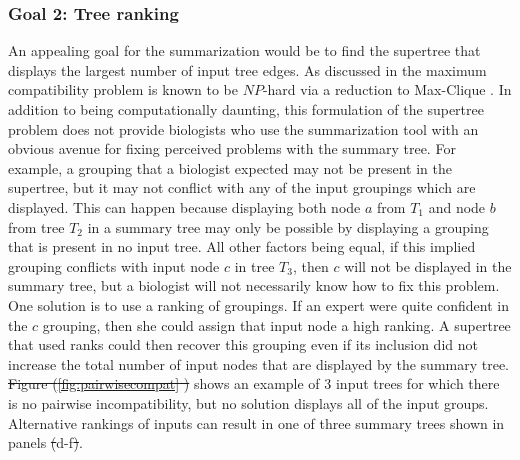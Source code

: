 \documentclass[fleqn,12pt,lineno,english]{wlpeerj}
\providecommand{\DIFaddtex}[1]{{\protect\color{blue}\uwave{#1}}} %
\providecommand{\DIFdeltex}[1]{{\protect\color{red}\sout{#1}}}                      %
\providecommand{\DIFaddbegin}{} %
\providecommand{\DIFaddend}{} %
\providecommand{\DIFdelbegin}{} %
\providecommand{\DIFdelend}{} %
\providecommand{\DIFadd}[1]{\texorpdfstring{\DIFaddtex{#1}}{#1}} %
\providecommand{\DIFdel}[1]{\texorpdfstring{\DIFdeltex{#1}}{}} %
\begin{document}
\subsubsection{Goal 2: Tree ranking}

An appealing goal for the summarization would be to find the supertree
that displays the largest number of input tree edges. As discussed
in \citet[pages 92 and 131;][]{HusonRS2010} the maximum compatibility
problem is known to be $NP$-hard via a reduction to Max-Clique \citep{Karp1972}.
In addition to being computationally daunting, this formulation of
the supertree problem does not provide biologists who use the summarization
tool with an obvious avenue for fixing perceived problems with the
summary tree. For example, a grouping that a biologist expected may
not be present in the supertree, but it may not conflict with any
of the input groupings which are displayed. This can happen because
displaying both node $a$ from $T_{1}$ and node $b$ from tree $T_{2}$
in a summary tree may only be possible by displaying a grouping that
is present in no input tree. All other factors being equal, if this
implied grouping conflicts with input node $c$ in tree $T_{3}$,
then $c$ will not be displayed in the summary tree, but a biologist
will not necessarily know how to fix this problem. One solution is
to use a ranking of groupings. If an expert were quite confident in
the $c$ grouping, then she could assign that input node a high ranking.
A supertree that used ranks could then recover this grouping even
if its inclusion did not increase the total number of input nodes
that are displayed by the summary tree. \DIFdelbegin \DIFdel{Figure (\ref{fig:pairwisecompat}
)
}\DIFdelend \DIFaddbegin \DIFadd{Fig. \ref{fig:pairwisecompat}
}\DIFaddend shows an example of 3 input trees for which there is no pairwise incompatibility,
but no solution displays all of the input groups. Alternative rankings
of inputs can result in one of three summary trees shown in panels
\DIFdelbegin \DIFdel{(}\DIFdelend d-f\DIFdelbegin \DIFdel{)}\DIFdelend . 
\end{document}
